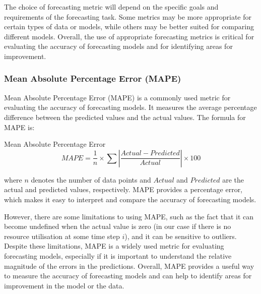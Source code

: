 



    The choice of forecasting metric will depend on the specific goals and requirements of the forecasting task. Some metrics may be more appropriate for certain types of data or models, while others may be better suited for comparing different models.
    Overall, the use of appropriate forecasting metrics is critical for evaluating the accuracy of forecasting models and for identifying areas for improvement.

    \subsubsection{Mean Absolute Percentage Error (MAPE)}
    \label{sec:mape-metrics-evaluation}
      Mean Absolute Percentage Error (MAPE) \cite{demyttenaereMeanAbsolutePercentage2016} is a commonly used metric for evaluating the accuracy of forecasting models. It measures the average percentage difference between the predicted values and the actual values.
      The formula for MAPE is:

      \begin{pabox}{Mean Absolute Percentage Error}
        $$MAPE = \frac{1}{n} \times \sum \left|\frac{Actual - Predicted}{Actual}\right| \times 100$$
      \end{pabox}
      where $n$ denotes the number of data points and $Actual$ and $Predicted$ are the actual and predicted values, respectively.
      MAPE provides a percentage error, which makes it easy to interpret and compare the accuracy of forecasting models. 
      
      However, there are some limitations to using MAPE, such as the fact that it can become undefined when the actual value is zero (in our case if there is no resource utilisation at some time step $i$), and it can be sensitive to outliers.
      Despite these limitations, MAPE is a widely used metric for evaluating forecasting models, especially if it is important to understand the relative magnitude of the errors in the predictions. 
      Overall, MAPE provides a useful way to measure the accuracy of forecasting models and can help to identify areas for improvement in the model or the data.


